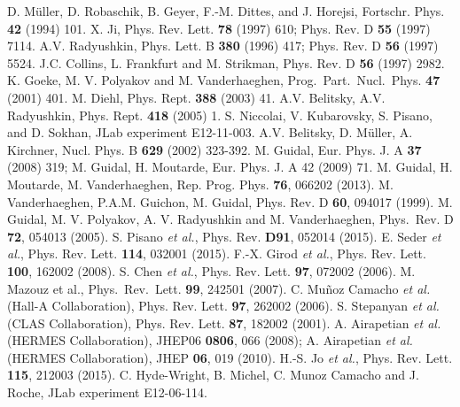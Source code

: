 \documentclass[a4paper,12pt]{report}
\begin{document}
\begin{thebibliography}{99}


D. M\"uller, D. Robaschik, B. Geyer, F.-M. Dittes, and J. Horejsi, Fortschr. Phys. {\bf 42} (1994) 101.
 X. Ji, Phys. Rev. Lett. {\bf 78} (1997) 610;
Phys. Rev. D {\bf 55} (1997) 7114.
 A.V. Radyushkin, Phys. Lett. B {\bf 380} (1996) 417; Phys. Rev. D {\bf 56} (1997) 5524.
 J.C. Collins, L. Frankfurt and M. Strikman, Phys. Rev. D {\bf 56} (1997) 2982.
 K. Goeke, M. V. Polyakov and M. Vanderhaeghen, Prog.\ Part.\ Nucl.\ Phys. {\bf 47} (2001) 401.
 M. Diehl, Phys.  Rept. {\bf 388} (2003) 41.
 A.V. Belitsky, A.V. Radyushkin, Phys. Rept. {\bf 418} (2005) 1.
 S. Niccolai, V. Kubarovsky, S. Pisano, and D. Sokhan, JLab experiment E12-11-003.
 A.V. Belitsky, D. M\"uller, A. Kirchner, Nucl. Phys. B {\bf 629} (2002) 323-392.
 M. Guidal, Eur. Phys. J. A {\bf 37} (2008) 319; M. Guidal, H. Moutarde, Eur. Phys. J. A 42 (2009) 71.
 M. Guidal, H. Moutarde, M. Vanderhaeghen, Rep. Prog. Phys. {\bf 76}, 066202 (2013).
 M. Vanderhaeghen, P.A.M. Guichon, M. Guidal, Phys. Rev. D {\bf 60}, 094017 (1999).
 M. Guidal, M. V. Polyakov, A. V. Radyushkin and 
M. Vanderhaeghen, Phys.\ Rev. D {\bf 72}, 054013 (2005).
 S. Pisano {\it et al.}, Phys. Rev. {\bf D91}, 052014 (2015).
 E. Seder {\it et al.}, Phys. Rev. Lett. {\bf 114}, 032001 (2015).
 F.-X. Girod {\it et al.}, Phys. Rev. Lett. {\bf 100}, 162002 (2008).
 S. Chen {\it et al.}, Phys. Rev. Lett. {\bf 97}, 072002 (2006).
 M. Mazouz et al., Phys.\ Rev.\ Lett. {\bf 99}, 242501 (2007).
 C. Mu\~noz Camacho {\it et al.} (Hall-A Collaboration), Phys. Rev. Lett. {\bf 97}, 262002 (2006).
 S. Stepanyan {\it et al.} (CLAS Collaboration), Phys. Rev. Lett. {\bf 87}, 182002 (2001).
 A. Airapetian {\it et al.} (HERMES Collaboration), JHEP06 {\bf 0806}, 066 (2008); A. Airapetian {\it et al.} (HERMES Collaboration), JHEP {\bf 06}, 019 (2010).
 H.-S. Jo {\it et al.}, Phys. Rev. Lett. {\bf 115}, 212003 (2015).
  C. Hyde-Wright, B. Michel, C. Munoz Camacho and J. Roche, JLab experiment E12-06-114.

\end{thebibliography}
\end{document}
